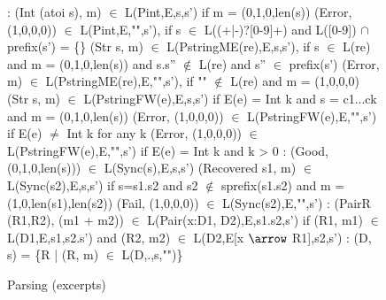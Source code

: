 \begin{figure}[t]
{\small
\begin{code}
\cdmath\small
{}:
(Int (atoi s), m) $\in$ L(Pint,E,s,s')
  if m = (0,1,0,len(s))
(Error, (1,0,0,0)) $\in$ L(Pint,E,"",s'), 
  if s $\in$ L((+|-)?[0-9]+) 
  and L([0-9]) $\cap$ prefix(s') = \{\}
(Str s, m) $\in$ L(PstringME(re),E,s,s'),
  if s $\in$ L(re) 
  and m = (0,1,0,len(s)) 
  and s.s'' $\not\in$ L(re) and s'' $\in$ prefix(s') 
(Error, m) $\in$ L(PstringME(re),E,"",s'), 
  if "" $\not\in$ L(re)
  and m = (1,0,0,0)
(Str s, m) $\in$ L(PstringFW(e),E,s,s') 
  if E(e) = Int k and s = c1...ck
  and m = (0,1,0,len(s))
(Error, (1,0,0,0)) $\in$ L(PstringFW(e),E,"",s') 
  if E(e) $\ne$ Int k for any k
(Error, (1,0,0,0)) $\in$ L(PstringFW(e),E,"",s') 
  if E(e) = Int k and k > 0
\mbox{}
:
(Good, (0,1,0,len(s))) $\in$ L(Sync(s),E,s,s')
(Recovered s1, m) $\in$ L(Sync(s2),E,s,s')
  if s=s1.s2 and s2 $\not\in$ sprefix(s1.s2)
  and m = (1,0,len(s1),len(s2))
(Fail, (1,0,0,0)) $\in$ L(Sync(s2),E,"",s')
\mbox{}
:
(PairR (R1,R2), (m1 + m2)) 
        $\in$ L(Pair(x:D1, D2),E,s1.s2,s')
  if  (R1, m1) $\in$ L(D1,E,s1,s2.s')
  and (R2, m2) $\in$ L(D2,E[x $\arrow$ R1],s2,s')
\mbox{}
:
(D, s) = \{R | (R, m) $\in$ L(D,.,s,"")\} 
\end{code}
}
\caption{Parsing (excerpts)}
\label{fig:parse-sem}
\end{figure}






